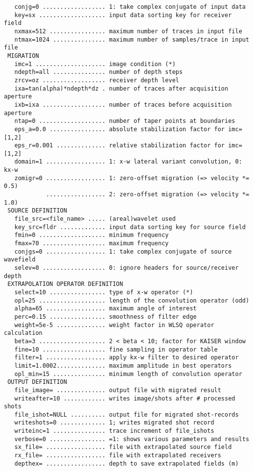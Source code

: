 {\begin{verbatim}
   conjg=0 .................. 1: take complex conjugate of input data
   key=sx ................... input data sorting key for receiver field
   nxmax=512 ................ maximum number of traces in input file
   ntmax=1024 ............... maximum number of samples/trace in input file
 MIGRATION 
   imc=1 .................... image condition (*)
   ndepth=all ............... number of depth steps
   zrcv=oz .................. receiver depth level
   ixa=tan(alpha)*ndepth*dz . number of traces after acquisition aperture
   ixb=ixa .................. number of traces before acquisition aperture
   ntap=0 ................... number of taper points at boundaries
   eps_a=0.0 ................ absolute stabilization factor for imc=[1,2]
   eps_r=0.001 .............. relative stabilization factor for imc=[1,2]
   domain=1 ................. 1: x-w lateral variant convolution, 0: kx-w
   zomigr=0 ................. 1: zero-offset migration (=> velocity *= 0.5)
            ................. 2: zero-offset migration (=> velocity *= 1.0)
 SOURCE DEFINITION 
   file_src=<file_name> ..... (areal)wavelet used 
   key_src=fldr ............. input data sorting key for source field
   fmin=0 ................... minimum frequency 
   fmax=70 .................. maximum frequency
   conjgs=0 ................. 1: take complex conjugate of source wavefield
   selev=0 .................. 0: ignore headers for source/receiver depth
 EXTRAPOLATION OPERATOR DEFINITION 
   select=10 ................ type of x-w operator (*)
   opl=25 ................... length of the convolution operator (odd)
   alpha=65 ................. maximum angle of interest
   perc=0.15 ................ smoothness of filter edge
   weight=5e-5 .............. weight factor in WLSQ operator calculation
   beta=3 ................... 2 < beta < 10; factor for KAISER window
   fine=10 .................. fine sampling in operator table
   filter=1 ................. apply kx-w filter to desired operator
   limit=1.0002.............. maximum amplitude in best operators
   opl_min=15 ............... minimum length of convolution operator
 OUTPUT DEFINITION 
   file_image= .............. output file with migrated result
   writeafter=10 ............ writes image/shots after # processed shots
   file_ishot=NULL .......... output file for migrated shot-records
   writeshots=0 ............. 1; writes migrated shot record
   writeinc=1 ............... trace increment of file_ishots
   verbose=0 ................ =1: shows various parameters and results
   sx_file= ................. file with extrapolated source field
   rx_file= ................. file with extrapolated receivers
   depthex= ................. depth to save extrapolated fields (m)
  

\end{verbatim}}
